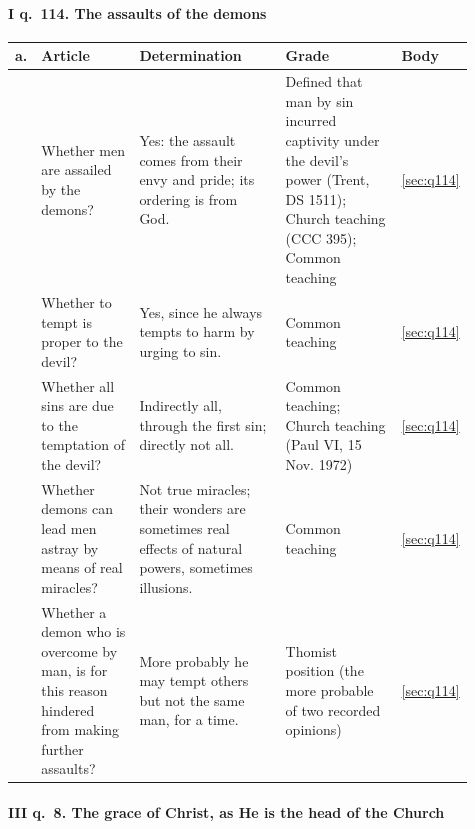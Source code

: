 \paragraph{I q.~114. The assaults of the demons}

\begingroup\footnotesize
\begin{longtable}{>{\raggedright\arraybackslash}p{0.03\linewidth}>{\raggedright\arraybackslash}p{0.22\linewidth}>{\raggedright\arraybackslash}p{0.33\linewidth}>{\raggedright\arraybackslash}p{0.27\linewidth}>{\raggedright\arraybackslash}p{0.06\linewidth}}
\toprule
\textbf{a.} & \textbf{Article} & \textbf{Determination} & \textbf{Grade} & \textbf{Body}\\
\midrule
\endhead
1 & Whether men are assailed by the demons? & Yes: the assault comes from their envy and pride; its ordering is from God. & Defined that man by sin incurred captivity under the devil's power (Trent, DS 1511); Church teaching (CCC 395); Common teaching & \ref{sec:q114}\\
2 & Whether to tempt is proper to the devil? & Yes, since he always tempts to harm by urging to sin. & Common teaching & \ref{sec:q114}\\
3 & Whether all sins are due to the temptation of the devil? & Indirectly all, through the first sin; directly not all. & Common teaching; Church teaching (Paul VI, 15 Nov. 1972) & \ref{sec:q114}\\
4 & Whether demons can lead men astray by means of real miracles? & Not true miracles; their wonders are sometimes real effects of natural powers, sometimes illusions. & Common teaching & \ref{sec:q114}\\
5 & Whether a demon who is overcome by man, is for this reason hindered from making further assaults? & More probably he may tempt others but not the same man, for a time. & Thomist position (the more probable of two recorded opinions) & \ref{sec:q114}\\
\bottomrule
\end{longtable}
\endgroup

\paragraph{III q.~8. The grace of Christ, as He is the head of the Church}


